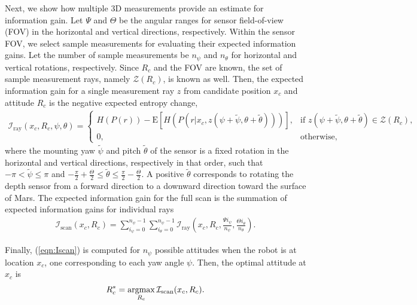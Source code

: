 \documentclass[conf]{new-aiaa}
\newcommand{\refeqn}[1]{(\ref{eqn:#1})}
\newcommand{\argmax}{\operatornamewithlimits{argmax}}
\begin{document}
Next, we show how multiple 3D measurements provide an estimate for information gain. Let $\Psi$ and $\Theta$ be the angular ranges for sensor field-of-view (FOV) in the horizontal and vertical directions, respectively. Within the sensor FOV, we select sample measurements for evaluating their expected information gains. Let the number of sample measurements be $n_\psi$ and $n_\theta$ for horizontal and vertical rotations, respectively. Since $R_c$ and the FOV are known, the set of sample measurement rays, namely $\mathcal{Z}(R_c)$, is known as well. Then, the expected information gain for a single measurement ray $z$ from candidate position $x_c$ and attitude $R_c$ is the negative expected entropy change,
\begin{align}
\label{eqn:Iray}
\mathcal{I}_\text{ray}(x_c,R_c,\psi,\theta)=
\begin{cases}
H(P(r))-\text{E}[H(P(r|x_c,z(\psi+\tilde{\psi},\theta+\tilde{\theta})))], & \mbox{if } z(\psi+\tilde{\psi},\theta+\tilde{\theta})\in\mathcal{Z}(R_c), \\ 
0,                                                                                    & \mbox{otherwise},
\end{cases}
\end{align}
where the mounting yaw $\tilde{\psi}$ and pitch $\tilde{\theta}$ of the sensor is a fixed rotation in the horizontal and vertical directions, respectively in that order, such that $-\pi<\tilde{\psi}\leq\pi$ and $-\frac{\pi}{2}+\frac\Theta2\leq\tilde{\theta}\leq\frac{\pi}{2}-\frac\Theta2$. A positive $\tilde{\theta}$ corresponds to rotating the depth sensor from a forward direction to a downward direction toward the surface of Mars. The expected information gain for the full scan is the summation of expected information gains for individual rays
\begin{align}
\label{eqn:Iscan}
\mathcal{I}_\text{scan}(x_c,R_c)=\sum_{i_\psi=0}^{n_\psi-1}\sum_{i_\theta=0}^{n_\psi-1}\mathcal{I}_\text{ray}\left(x_c,R_c,\frac{\Psi i_\psi}{n_\psi},\frac{\Theta i_\theta}{n_\theta}\right).
\end{align}

Finally, \refeqn{Iscan} is computed for $n_\psi$ possible attitudes when the robot is at location $x_c$, one corresponding to each yaw angle $\psi$. Then, the optimal attitude at $x_c$ is
\begin{align}
\label{eqn:RcStar}
R_c^*=\argmax_{R_c} \mathcal{I}_\text{scan}(x_c,R_c).
\end{align}
\end{document}
